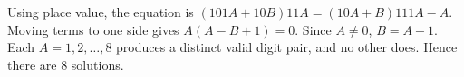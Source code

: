 Using place value, the equation is $(101A+10B)11A=(10A+B)111A-A$. Moving terms to one side gives $A(A-B+1)=0$. Since $A\ne0$, $B=A+1$. Each $A=1,2,\ldots,8$ produces a distinct valid digit pair, and no other does. Hence there are $\boxed8$ solutions.

